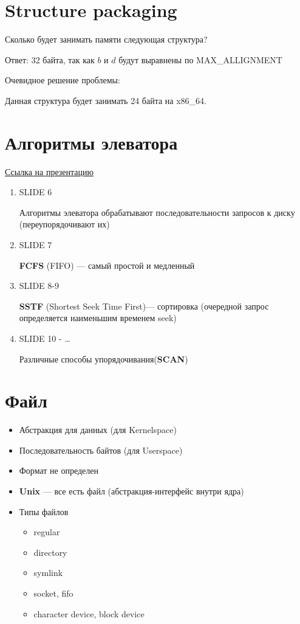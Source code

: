 \documentclass[../../lectures.tex]{subfiles}
\begin{document}
\section{Structure packaging}
Сколько будет занимать памяти следующая структура?


Ответ: 32 байта, так как $b$ и $d$ будут выравнены по MAX\_ALLIGNMENT

Очевидное решение проблемы:


Данная структура будет занимать 24 байта на x86\_64.

\section{Алгоритмы элеватора}
\textcolor{blue}{\href{https://slideplayer.com/slide/5209336}{Ссылка на презентацию}}
\begin{enumerate}
    \item SLIDE 6
        
          Алгоритмы элеватора обрабатывают последовательности запросов к диску (переупорядочивают их)
    \item SLIDE 7

          \textbf{FCFS} (FIFO) --- самый простой и медленный
    \item SLIDE 8-9

          \textbf{SSTF} (Shortest Seek Time First)--- сортировка (очередной запрос определяется наименьшим временем seek)
    \item SLIDE 10 - \dots

          Различные способы упорядочивания(\textbf{SCAN})
\end{enumerate}

\section{Файл}
\begin{itemize}
    \item Абстракция для данных (для Kernelspace)
    \item Последовательность байтов (для Userspace)
    \item Формат не определен
    \item \textbf{Unix} --- все есть файл (абстракция-интерфейс внутри ядра)
    \item Типы файлов 
          \begin{itemize}
            \item regular
            \item directory
            \item symlink
            \item socket, fifo
            \item character device, block device
          \end{itemize}
\end{itemize}
\end{document}
